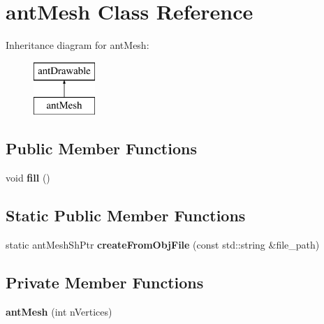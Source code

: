 \hypertarget{classant_mesh}{\section{ant\+Mesh Class Reference}
\label{classant_mesh}
}
Inheritance diagram for ant\+Mesh\+:\begin{figure}[H]
\begin{center}
\leavevmode
\includegraphics[height=2.000000cm]{classant_mesh}
\end{center}
\end{figure}
\subsection*{Public Member Functions}
\begin{DoxyCompactItemize}
\item 
\hypertarget{classant_mesh_a72ceed4cd84ffc04ab8775cbfb7bf171}{void {\bfseries fill} ()}\label{classant_mesh_a72ceed4cd84ffc04ab8775cbfb7bf171}

\end{DoxyCompactItemize}
\subsection*{Static Public Member Functions}
\begin{DoxyCompactItemize}
\item 
\hypertarget{classant_mesh_a7cefde0c04d7928c6394e1a10573d31b}{static ant\+Mesh\+Sh\+Ptr {\bfseries create\+From\+Obj\+File} (const std\+::string \&file\+\_\+path)}\label{classant_mesh_a7cefde0c04d7928c6394e1a10573d31b}

\end{DoxyCompactItemize}
\subsection*{Private Member Functions}
\begin{DoxyCompactItemize}
\item 
\hypertarget{classant_mesh_adb3128af13ce66a28abd285c01cacc3a}{{\bfseries ant\+Mesh} (int n\+Vertices)}\label{classant_mesh_adb3128af13ce66a28abd285c01cacc3a}

\end{DoxyCompactItemize}
